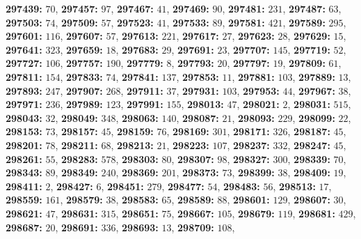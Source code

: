 \textsf{\bfseries 297439:} $70$, \textsf{\bfseries 297457:} $97$, \textsf{\bfseries 297467:} $41$, \textsf{\bfseries 297469:} $90$, \textsf{\bfseries 297481:} $231$, \textsf{\bfseries 297487:} $63$, \textsf{\bfseries 297503:} $74$, \textsf{\bfseries 297509:} $57$, \textsf{\bfseries 297523:} $41$, \textsf{\bfseries 297533:} $89$, \textsf{\bfseries 297581:} $421$, \textsf{\bfseries 297589:} $295$, \textsf{\bfseries 297601:} $116$, \textsf{\bfseries 297607:} $57$, \textsf{\bfseries 297613:} $221$, \textsf{\bfseries 297617:} $27$, \textsf{\bfseries 297623:} $28$, \textsf{\bfseries 297629:} $15$, \textsf{\bfseries 297641:} $323$, \textsf{\bfseries 297659:} $18$, \textsf{\bfseries 297683:} $29$, \textsf{\bfseries 297691:} $23$, \textsf{\bfseries 297707:} $145$, \textsf{\bfseries 297719:} $52$, \textsf{\bfseries 297727:} $106$, \textsf{\bfseries 297757:} $190$, \textsf{\bfseries 297779:} $8$, \textsf{\bfseries 297793:} $20$, \textsf{\bfseries 297797:} $19$, \textsf{\bfseries 297809:} $61$, \textsf{\bfseries 297811:} $154$, \textsf{\bfseries 297833:} $74$, \textsf{\bfseries 297841:} $137$, \textsf{\bfseries 297853:} $11$, \textsf{\bfseries 297881:} $103$, \textsf{\bfseries 297889:} $13$, \textsf{\bfseries 297893:} $247$, \textsf{\bfseries 297907:} $268$, \textsf{\bfseries 297911:} $37$, \textsf{\bfseries 297931:} $103$, \textsf{\bfseries 297953:} $44$, \textsf{\bfseries 297967:} $38$, \textsf{\bfseries 297971:} $236$, \textsf{\bfseries 297989:} $123$, \textsf{\bfseries 297991:} $155$, \textsf{\bfseries 298013:} $47$, \textsf{\bfseries 298021:} $2$, \textsf{\bfseries 298031:} $515$, \textsf{\bfseries 298043:} $32$, \textsf{\bfseries 298049:} $348$, \textsf{\bfseries 298063:} $140$, \textsf{\bfseries 298087:} $21$, \textsf{\bfseries 298093:} $229$, \textsf{\bfseries 298099:} $22$, \textsf{\bfseries 298153:} $73$, \textsf{\bfseries 298157:} $45$, \textsf{\bfseries 298159:} $76$, \textsf{\bfseries 298169:} $301$, \textsf{\bfseries 298171:} $326$, \textsf{\bfseries 298187:} $45$, \textsf{\bfseries 298201:} $78$, \textsf{\bfseries 298211:} $68$, \textsf{\bfseries 298213:} $21$, \textsf{\bfseries 298223:} $107$, \textsf{\bfseries 298237:} $332$, \textsf{\bfseries 298247:} $45$, \textsf{\bfseries 298261:} $55$, \textsf{\bfseries 298283:} $578$, \textsf{\bfseries 298303:} $80$, \textsf{\bfseries 298307:} $98$, \textsf{\bfseries 298327:} $300$, \textsf{\bfseries 298339:} $70$, \textsf{\bfseries 298343:} $89$, \textsf{\bfseries 298349:} $240$, \textsf{\bfseries 298369:} $201$, \textsf{\bfseries 298373:} $73$, \textsf{\bfseries 298399:} $38$, \textsf{\bfseries 298409:} $19$, \textsf{\bfseries 298411:} $2$, \textsf{\bfseries 298427:} $6$, \textsf{\bfseries 298451:} $279$, \textsf{\bfseries 298477:} $54$, \textsf{\bfseries 298483:} $56$, \textsf{\bfseries 298513:} $17$, \textsf{\bfseries 298559:} $161$, \textsf{\bfseries 298579:} $38$, \textsf{\bfseries 298583:} $65$, \textsf{\bfseries 298589:} $88$, \textsf{\bfseries 298601:} $129$, \textsf{\bfseries 298607:} $30$, \textsf{\bfseries 298621:} $47$, \textsf{\bfseries 298631:} $315$, \textsf{\bfseries 298651:} $75$, \textsf{\bfseries 298667:} $105$, \textsf{\bfseries 298679:} $119$, \textsf{\bfseries 298681:} $429$, \textsf{\bfseries 298687:} $20$, \textsf{\bfseries 298691:} $336$, \textsf{\bfseries 298693:} $13$, \textsf{\bfseries 298709:} $108$, 

